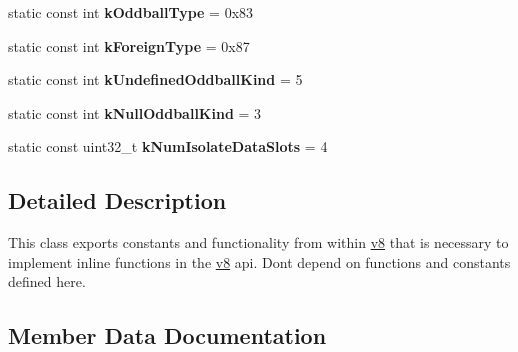 \begin{DoxyCompactItemize}
\item 
static const int {\bfseries k\+Oddball\+Type} = 0x83\hypertarget{classv8_1_1internal_1_1_internals_a13081e936f8c96472f1b1496c70d4dc1}{}\label{classv8_1_1internal_1_1_internals_a13081e936f8c96472f1b1496c70d4dc1}

\item 
static const int {\bfseries k\+Foreign\+Type} = 0x87\hypertarget{classv8_1_1internal_1_1_internals_a263195f36f9e8ee64af70dc267a85d55}{}\label{classv8_1_1internal_1_1_internals_a263195f36f9e8ee64af70dc267a85d55}

\item 
static const int {\bfseries k\+Undefined\+Oddball\+Kind} = 5\hypertarget{classv8_1_1internal_1_1_internals_a39072b9e0ffea4031f4a1c514208b20d}{}\label{classv8_1_1internal_1_1_internals_a39072b9e0ffea4031f4a1c514208b20d}

\item 
static const int {\bfseries k\+Null\+Oddball\+Kind} = 3\hypertarget{classv8_1_1internal_1_1_internals_a72243c5512cb5cab9d10b6f29e775180}{}\label{classv8_1_1internal_1_1_internals_a72243c5512cb5cab9d10b6f29e775180}

\item 
static const uint32\+\_\+t {\bfseries k\+Num\+Isolate\+Data\+Slots} = 4\hypertarget{classv8_1_1internal_1_1_internals_a258de87ae638f06a1deebccf4fd93c3f}{}\label{classv8_1_1internal_1_1_internals_a258de87ae638f06a1deebccf4fd93c3f}

\end{DoxyCompactItemize}


\subsection{Detailed Description}
This class exports constants and functionality from within \hyperlink{namespacev8}{v8} that is necessary to implement inline functions in the \hyperlink{namespacev8}{v8} api. Don\textquotesingle{}t depend on functions and constants defined here. 

\subsection{Member Data Documentation}
